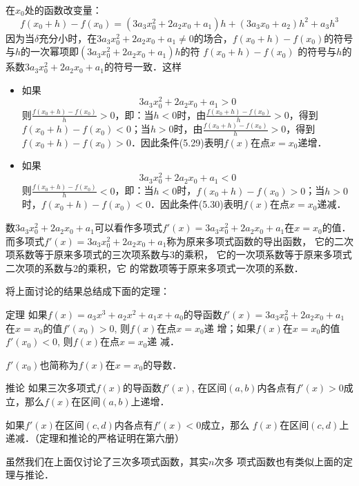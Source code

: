 在$x_0$处的函数改变量：
\[f(x_0+h)-f(x_0)=(3a_3x_0^2+2a_2x_0+a_1)h+(3a_3x_0+
a_2)h^2+a_3h^3\]
因为当$\delta$充分小时，在$3a_3x_0^2+2a_2x_0+a_1\ne 0$的场合，$f(x_0+h)-f(x_0)$的符号与$h$的一次幂项即$(3a_3x_0^2+2a_2x_0+a_1)h$的符
$f(x_0+h)-f(x_0)$
的符号与$h$的系数$3a_3x_0^2+2a_2x_0+a_1$的符号一致．这样
\begin{itemize}
    \item 如果
    \begin{equation}
        3a_3x_0^2+2a_2x_0+a_1>0
    \end{equation}
    则$\frac{f(x_0+h)-f(x_0)}{h}>0$，即：当$h<0$时，由$\frac{f(x_0+h)-f(x_0)}{h}>0$，得到$f(x_0+h)-f(x_0)<0$；当$h>0$时，由$\frac{f(x_0+h)-f(x_0)}{h}>0$，得到$f(x_0+h)-f(x_0)>0$．因此条件(5.29)表明$f(x)$在点$x=x_0$递增．
    \item 如果
    \begin{equation}
        3a_3x_0^2+2a_2x_0+a_1<0
    \end{equation}
    则$\frac{f(x_0+h)-f(x_0)}{h}<0$，即：当$h<0$时，$f(x_0+h)-f(x_0)>0$；当$h>0$时，$f(x_0+h)-f(x_0)<0$．因此条件(5.30)表明$f(x)$在点$x=x_0$递减．
\end{itemize}

数$3a_3x_0^2+2a_2x_0+a_1$可以看作多项式$f'(x)=3a_3x_0^2+2a_2x_0+a_1$在$x=x_0$的值．而多项式$f'(x)=3a_3x_0^2+2a_2x_0+a_1$称为原来多项式函数的导出函数，
    它的二次项系数等于原来多项式的三次项系数与3的乘积，
    它的一次项系数等于原来多项式二次项的系数与2的乘积，它
    的常数项等于原来多项式一次项的系数．

    将上面讨论的结果总结成下面的定理：

\begin{blk}{定理}
    如果$f(x)=a_3x^3+a_2x^2+a_1x+a_0$的导函数$f'(x)=3a_3x_0^2+2a_2x_0+a_1$在$x=x_0$的值$f'(x_0)>0$, 则$f(x)$在点$x=x_0$递
增；如果$f(x)$在$x=x_0$的值$f'(x_0)<0$, 则$f(x)$在点$x=x_0$递
减．
\end{blk}

$f'(x_0)$也简称为$f(x)$在$x=x_0$的导数．

\begin{blk}{推论}
    如果三次多项式$f(x)$的导函数$f'(x)$, 在区间$(a,
b)$内各点有$f'(x)>0$成立，那么$f(x)$在区间$(a,b)$上递增．

如果$f'(x)$在区间$(c,d)$内各点有$f'(x)<0$成立，那么
$f(x)$在区间$(c,d)$上递减．（定理和推论的严格证明在第六册）
\end{blk}
 
虽然我们在上面仅讨论了三次多项式函数，其实$n$次多
项式函数也有类似上面的定理与推论．





